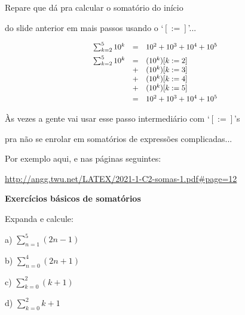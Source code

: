 \documentclass[oneside,12pt]{article}
\begin{document}
\newpage


Repare que dá pra calcular o somatório do início

do slide anterior em mais passos usando o `$[:=]$'...

$$\scalebox{0.9}{$
  \begin{array}{rcl}
         \sum_{k=2}^{5} 10^k &=& 10^2 + 10^3 + 10^4 + 10^5 \\[5pt]
         \sum_{k=2}^{5} 10^k &=& (10^k) [k:=2] \\
                             &+& (10^k) [k:=3] \\
                             &+& (10^k) [k:=4] \\
                             &+& (10^k) [k:=5] \\[2.5pt]
                             &=& 10^2 + 10^3 + 10^4 + 10^5 \\
  \end{array}
  $}
$$

Às vezes a gente vai usar esse passo intermediário com `$[:=]$'s

pra não se enrolar em somatórios de expressões complicadas...

Por exemplo aqui, e nas páginas seguintes:

\ssk

{\footnotesize

\url{http://angg.twu.net/LATEX/2021-1-C2-somas-1.pdf\#page=12}

}


\newpage


{\bf Exercícios básicos de somatórios}

\msk

Expanda e calcule:

a) $\sum_{n=1}^5 (2n-1)$

\ssk

b) $\sum_{n=0}^4 (2n+1)$

\msk

c) $\sum_{k=0}^2 (k+1)$

\msk

d) $\sum_{k=0}^2 k + 1$

\msk
\end{document}
